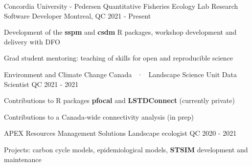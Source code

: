 \vspace{3pt}

\vspace{-2pt}
\begin{cventries}

  \cventry
    {Concordia University - Pedersen Quantitative Fisheries Ecology Lab} %
    {Research Software Developer} %
    {Montreal, QC} %
    {2021 - Present} %
    {
      \begin{cvitems} %
        \item {Development of the \textbf{sspm} and \textbf{csdm} R packages, workshop development and delivery with DFO}
        \item {Grad student mentoring: teaching of skills for open and reproducible science}
      \end{cvitems}
    }

  \cventry
  {Environment and Climate Change Canada ~·~ Landscape Science Unit} %
  {Data Scientist} %
  {QC} %
  {2021 - 2021} %
  {
    \begin{cvitems} %
      \item {Contributions to R packages \textbf{pfocal} and \textbf{LSTDConnect} (currently private)}
      \item {Contributions to a Canada-wide connectivity analysis (in prep)}
    \end{cvitems}
  }

  \cventry
  {APEX Resources Management Solutions} %
  {Landscape ecologist} %
  {QC} %
  {2020 - 2021} %
  {
    \begin{cvitems} %
      \item {Projects: carbon cycle models, epidemiological models, \textbf{STSIM} development and maintenance}
    \end{cvitems}
  }

\end{cventries}


